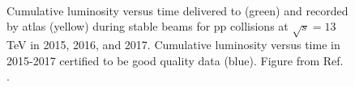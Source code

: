 \begin{figure}[ht]
\centering
{}
\\
\caption{Cumulative luminosity versus time delivered to (green) and recorded by \gls{atlas} (yellow) during stable beams for pp collisions at $\sqrt{s}=13$ TeV in  2015,  2016, 
and  2017.  Cumulative luminosity versus time in 2015-2017 certified to be good quality data (blue). Figure from Ref. \cite{LumiTwiki}.}
\label{fig:atlas:lumi1}
\end{figure}

